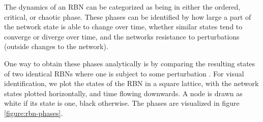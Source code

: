 The dynamics of an RBN can be categorized as being in either the ordered, critical, or chaotic phase.
These phases can be identified by how large a part of the network state is able to change over time,
whether similar states tend to converge or diverge over time,
and the networks resistance to perturbations (outside changes to the network).

One way to obtain these phases analytically is by comparing the resulting states of two identical RBNs where one is subject to some perturbation \cite{gershenson2004introduction}.
For visual identification, we plot the states of the RBN in a square lattice,
with the network states plotted horizontally, and time flowing downwards.
A node is drawn as white if its state is one, black otherwise.
The phases are visualized in figure \ref{figure:rbn-phases}.

